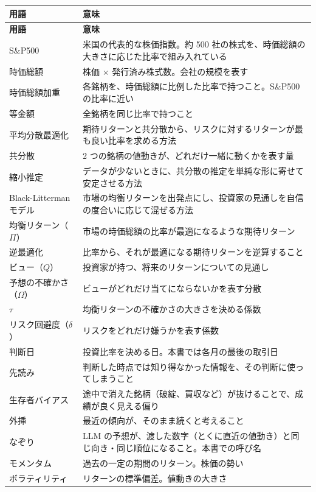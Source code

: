 \documentclass[xelatex,ja=standard,jafont=hiragino-pron,a4paper,10pt]{bxjsreport}
\newcommand{\SP}{S\&P500}
\begin{document}
\begin{longtable}{p{4.20cm}p{10.20cm}}
\toprule
\textbf{用語} & \textbf{意味} \\
\midrule
\endfirsthead
\toprule
\textbf{用語} & \textbf{意味} \\
\midrule
\endhead
\bottomrule
\endfoot
\SP{} & 米国の代表的な株価指数。約 500 社の株式を、時価総額の大きさに応じた比率で組み入れている \\
時価総額 & 株価 $\times$ 発行済み株式数。会社の規模を表す \\
時価総額加重 & 各銘柄を、時価総額に比例した比率で持つこと。\SP{} の比率に近い \\
等金額 & 全銘柄を同じ比率で持つこと \\
平均分散最適化 & 期待リターンと共分散から、リスクに対するリターンが最も良い比率を求める方法 \\
共分散 & 2 つの銘柄の値動きが、どれだけ一緒に動くかを表す量 \\
縮小推定 & データが少ないときに、共分散の推定を単純な形に寄せて安定させる方法 \\
Black-Litterman モデル & 市場の均衡リターンを出発点にし、投資家の見通しを自信の度合いに応じて混ぜる方法 \\
均衡リターン（$\Pi$） & 市場の時価総額の比率が最適になるような期待リターン \\
逆最適化 & 比率から、それが最適になる期待リターンを逆算すること \\
ビュー（$Q$） & 投資家が持つ、将来のリターンについての見通し \\
予想の不確かさ（$\Omega$） & ビューがどれだけ当てにならないかを表す分散 \\
$\tau$ & 均衡リターンの不確かさの大きさを決める係数 \\
リスク回避度（$\delta$） & リスクをどれだけ嫌うかを表す係数 \\
判断日 & 投資比率を決める日。本書では各月の最後の取引日 \\
先読み & 判断した時点では知り得なかった情報を、その判断に使ってしまうこと \\
生存者バイアス & 途中で消えた銘柄（破綻、買収など）が抜けることで、成績が良く見える偏り \\
外挿 & 最近の傾向が、そのまま続くと考えること \\
なぞり & LLM の予想が、渡した数字（とくに直近の値動き）と同じ向き・同じ順位になること。本書での呼び名 \\
モメンタム & 過去の一定の期間のリターン。株価の勢い \\
ボラティリティ & リターンの標準偏差。値動きの大きさ \\

\end{longtable}
\end{document}
